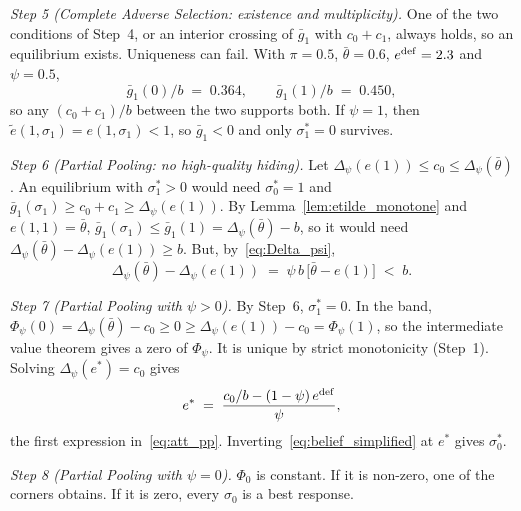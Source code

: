 \emph{Step 5 (Complete Adverse Selection: existence and multiplicity).} One of the two conditions of Step~4, or an interior crossing of $\bar g_1$ with $c_0+c_1$, always holds, so an equilibrium exists. Uniqueness can fail. With $\pi=0.5$, $\bar\theta=0.6$, $e^{\rm def}=2.3$ and $\psi=0.5$,
\begin{equation*}
    \bar g_1(0)/b\;=\;0.364,\qquad\bar g_1(1)/b\;=\;0.450,
\end{equation*}
so any $(c_0+c_1)/b$ between the two supports both. If $\psi=1$, then $\tilde e(1,\sigma_1)=e(1,\sigma_1)<1$, so $\bar g_1<0$ and only $\sigma_1^*=0$ survives.

\emph{Step 6 (Partial Pooling: no high-quality hiding).} Let $\Delta_\psi(e(1))\le c_0\le\Delta_\psi(\bar\theta)$. An equilibrium with $\sigma_1^*>0$ would need $\sigma_0^*=1$ and $\bar g_1(\sigma_1)\ge c_0+c_1\ge\Delta_\psi(e(1))$. By Lemma~\ref{lem:etilde_monotone} and $e(1,1)=\bar\theta$, $\bar g_1(\sigma_1)\le\bar g_1(1)=\Delta_\psi(\bar\theta)-b$, so it would need $\Delta_\psi(\bar\theta)-\Delta_\psi(e(1))\ge b$. But, by~\eqref{eq:Delta_psi},
\begin{equation*}
    \Delta_\psi(\bar\theta)-\Delta_\psi(e(1))\;=\;\psi\,b\,\big[\bar\theta-e(1)\big]\;<\;b.
\end{equation*}

\emph{Step 7 (Partial Pooling with $\psi>0$).} By Step~6, $\sigma_1^*=0$. In the band, $\Phi_\psi(0)=\Delta_\psi(\bar\theta)-c_0\ge0\ge\Delta_\psi(e(1))-c_0=\Phi_\psi(1)$, so the intermediate value theorem gives a zero of $\Phi_\psi$. It is unique by strict monotonicity (Step~1). Solving $\Delta_\psi(e^*)=c_0$ gives
\begin{equation*}
    e^*\;=\;\frac{c_0/b-(1-\psi)\,e^{\rm def}}{\psi},
\end{equation*}
the first expression in~\eqref{eq:att_pp}. Inverting~\eqref{eq:belief_simplified} at $e^*$ gives $\sigma_0^*$.

\emph{Step 8 (Partial Pooling with $\psi=0$).} $\Phi_0$ is constant. If it is non-zero, one of the corners obtains. If it is zero, every $\sigma_0$ is a best response.
